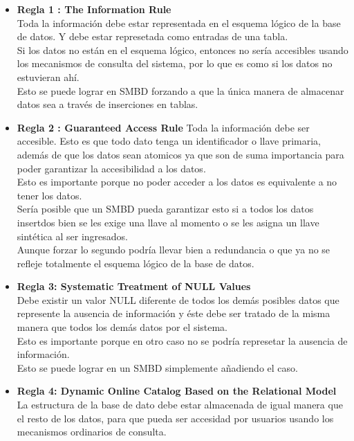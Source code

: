\documentclass{article}
\begin{document}
    \begin{itemize}
    	\item\textbf{Regla 1 : The Information Rule}\\
        Toda la información debe estar representada en el esquema lógico de la 
        base de datos. Y debe estar represetada como entradas de una tabla.\\
        Si los datos no están en el esquema lógico, entonces no sería accesibles
        usando los mecanismos de consulta del sistema, por lo que es como si 
        los datos no estuvieran ahí.\\
        Esto se puede lograr en SMBD forzando a que la única manera de almacenar 
        datos sea a través de inserciones en tablas.
    	\item\textbf{Regla 2 : Guaranteed Access Rule}
        Toda la información debe ser accesible. Esto es que todo dato tenga un 
        identificador o llave primaria, además de  que los datos sean atomicos 
        ya que son de suma importancia para poder garantizar la accesibilidad a 
        los datos.\\
        Esto es importante porque no poder acceder a los datos es equivalente a
        no tener los datos. \\
        Sería posible que un SMBD pueda garantizar esto si a todos los datos 
        insertdos bien se les exige una llave al momento o se les asigna un 
        llave sintética al ser ingresados.\\
        Aunque forzar lo segundo podría llevar bien a redundancia o que ya no 
        se refleje totalmente el esquema lógico de la base de datos.
    	\item\textbf{Regla 3: Systematic Treatment of NULL Values}\\
        Debe existir un valor NULL diferente de todos los demás posibles datos 
        que represente la ausencia de información y éste debe ser tratado de la 
        misma manera que todos los demás datos por el sistema.\\
        Esto es importante porque en otro caso no se podría represetar la 
        ausencia de información.\\
        Esto se puede lograr en un SMBD simplemente añadiendo el caso.
    	\item\textbf{Regla 4: Dynamic Online Catalog Based on the Relational Model}\\
        La estructura de la base de dato debe estar almacenada de igual manera 
        que el resto de los datos, para que pueda ser accesidad por usuarios usando
        los mecanismos ordinarios de consulta.
    	

\end{itemize}
\end{document}
